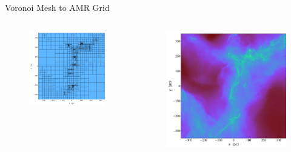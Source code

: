 \documentclass[aspectratio=169]{beamer}
\begin{document}
\begin{frame}{Voronoi Mesh to AMR Grid}
\begin{columns}
\begin{column}{0.3\textwidth}
\begin{figure}[h!]
                \includegraphics[width=\linewidth]{../images/amr_grid_from_voronoi.png}
                \label{fig:amr_example}
            \end{figure}
        \end{column}
        \begin{column}{0.3\textwidth}
                \begin{figure}[h!]
                \centering
                \includegraphics[width=\linewidth]{../images/VorAMR_hdf5_chk_0001_Projection_z_dens.png}

\end{figure}
\end{column}
\end{columns}
\end{frame}
\end{document}
